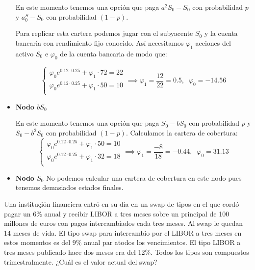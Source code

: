 \begin{problem}[2]
\begin{itemize}
En este momento tenemos una opción que paga $a^2S_0-S_0$ con probabilidad $p$ y $a^S_0-S_0$ con probabilidad $(1-p)$.

Para replicar esta cartera podemos jugar con el subyacente $S_0$ y la cuenta bancaria con rendimiento fijo conocido. Así necesitamos $\varphi_1$ acciones del activo $S_0$ e $\varphi_0$ de la cuenta bancaria de modo que:

\[\left\{\begin{array}{l}
\varphi_0 e^{0.12\cdot 0.25}+\varphi_1 \cdot 72 = 22 \\
\varphi_0 e^{0.12\cdot 0.25}+\varphi_1 \cdot 50 = 10 \\
\end{array}\right. \implies \varphi_1 = \frac{12}{22} = 0.5, \;\; \varphi_0 = -14.56\]

\item \textbf{Nodo $bS_0$}

En este momento tenemos una opción que paga $S_0-bS_0$ con probabilidad $p$ y $S_0-b^2S_0$ con probabilidad $(1-p)$. Calculamos la cartera de cobertura:
\[\left\{\begin{array}{l}
\varphi_0 e^{0.12\cdot 0.25}+\varphi_1 \cdot 50 = 10 \\
\varphi_0 e^{0.12\cdot 0.25}+\varphi_1 \cdot 32 = 18 \\
\end{array}\right. \implies \varphi_1 = \frac{-8}{18} = -0.44, \;\; \varphi_0 = 31.13\]

\item \textbf{Nodo $S_0$}
No podemos calcular una cartera de cobertura en este nodo pues tenemos demasiados estados finales.
\end{itemize}

\end{problem}

\begin{problem}[3]
Una instituçión financiera entró en su día en un swap de tipos en el que cordó pagar un 6\% anual y recibir LIBOR a tres meses sobre un principal de 100 millones de euros con pagos intercambiados cada tres meses. Al swap le quedan 14 meses de vida. El tipo swap para intercambio por el LIBOR a tres meses en estos momentos es del 9\% anual par atodos los vencimientos. El tipo LIBOR a tres meses publicado hace dos meses era del 12\%. Todos los tipos son compuestos trimestralmente. ¿Cuál es el valor actual del swap?
\solution

\end{problem}


